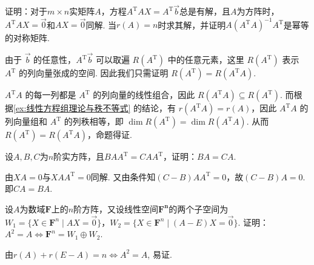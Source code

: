 \begin{exercise}
\begin{exgroup}
        \item 证明：对于$m \times n$实矩阵$A$，方程$A^\mathrm{T}AX = A^\mathrm{T}\vec{b}$总是有解，且$A$为方阵时，$A^\mathrm{T}AX = \vec{0}$和$AX=\vec{0}$同解. 当$r(A)=n$时求其解，并证明$A(A^\mathrm{T}A)^{-1}A^\mathrm{T}$是幂等的对称矩阵.
        \begin{answer}
            由于 $\vec{b}$ 的任意性，$A^\mathrm{T}\vec{b}$ 可以取遍 $R(A^\mathrm{T})$ 中的任意元素，这里 $R(A^\mathrm{T})$ 表示 $A^\mathrm{T}$ 的列向量张成的空间. 因此我们只需证明 $R(A^\mathrm{T}) = R(A^\mathrm{T}A)$.

            $A^\mathrm{T}A$ 的每一列都是 $A^\mathrm{T}$ 的列向量的线性组合，因此 $R(A^\mathrm{T}A) \subseteq R(A^\mathrm{T})$. 而根据\autoref{ex:线性方程组理论与秩不等式} 的结论，有 $r(A^\mathrm{T}A) = r(A)$，因此 $A^\mathrm{T}A$ 的列向量组和 $A^\mathrm{T}$ 的列秩相等，即 $\dim R(A^\mathrm{T}) = \dim R(A^\mathrm{T}A)$. 从而 $R(A^\mathrm{T}) = R(A^\mathrm{T}A)$，命题得证.
        \end{answer}

        \item 设$A,B,C$为$n$阶实方阵，且$BAA^\mathrm{T}=CAA^\mathrm{T}$，证明：$BA=CA$.
        \begin{answer}
            由$XA=0$与$XAA^{\mathrm{T}}=0$同解. 又由条件知$(C-B)AA^\mathrm{T}=0$，故$(C-B)A=0$. 即$CA=BA$.
        \end{answer}

        \item 设$A$为数域$\mathbf{F}$上的$n$阶方阵，又设线性空间$\mathbf{F^n}$的两个子空间为$W_1=\{X\in\mathbf{F}^n \mid AX=\vec{0}\}$，$W_2=\{X\in\mathbf{F}^n \mid (A-E)X=\vec{0}\}$. 证明：$A^2=A \iff \mathbf{F}^n=W_1\oplus W_2$.
        \begin{answer}
            由$r(A)+r(E-A)=n \iff A^2=A$, 易证.
        \end{answer}


\end{exgroup}
\end{exercise}

